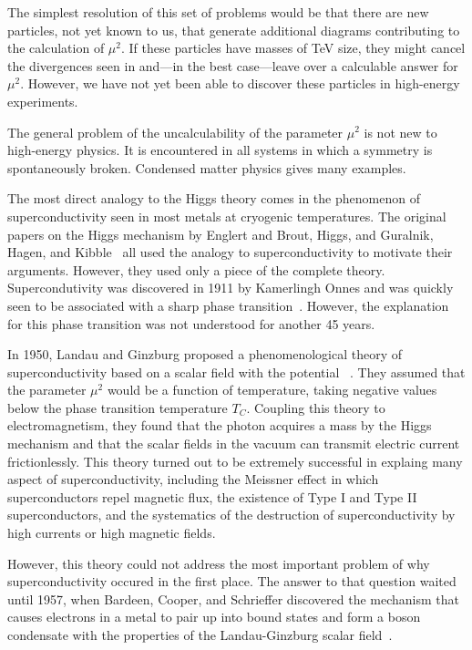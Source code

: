 \documentclass[12pt]{article}
\begin{document}
The simplest resolution of this set of problems would be that there
are new particles, not yet known to us, that generate additional
diagrams contributing to the calculation of $\mu^2$.   If these
particles have masses of TeV size, they might cancel the
divergences seen in  and---in the best case---leave
over a calculable answer for $\mu^2$.   However, we have not yet been
able to discover these particles in high-energy experiments.

The general problem of the uncalculability of the parameter $\mu^2$ is
not new to high-energy physics.   It is encountered in all systems in
which a symmetry is spontaneously broken.   Condensed matter physics
gives many examples.

The most direct analogy to the Higgs theory comes in the phenomenon of
superconductivity seen in most metals at cryogenic temperatures.   The
original papers on the Higgs mechanism by Englert and Brout, Higgs, 
and Guralnik, Hagen, and Kibble~\cite{BE,Higgs,GHK}  all used the analogy to
superconductivity to motivate their arguments.  However, they used
only a piece of the complete theory.   Supercondutivity was discovered
in 1911 by Kamerlingh Onnes and was quickly seen to be associated with
a sharp phase transition~\cite{Onnes}.  However, the explanation for this phase
transition was not understood for another 45 years.

In 1950, Landau and Ginzburg proposed a phenomenological theory of
superconductivity based on a scalar field with the potential
~\cite{Landau}.    They assumed that the parameter $\mu^2$
would be a function of temperature, taking negative values below the
phase transition temperature  $T_C$.   Coupling this theory to
electromagnetism, they found that the photon acquires a mass by the
Higgs mechanism and that the scalar fields in the vacuum can transmit
electric current frictionlessly. 
  This theory turned out to be extremely successful in
explaing many aspect of superconductivity, including the Meissner
effect in which superconductors repel magnetic flux, the existence of
Type I and Type II superconductors, and the systematics of the
destruction of superconductivity by high currents or high magnetic
fields.

However, this theory could not address the most important problem of
why superconductivity occured in the first place.  The answer to that
question waited until 1957, when Bardeen, Cooper, and Schrieffer
discovered the mechanism that causes electrons in a metal to pair up
into bound states and form a boson condensate with the properties of the Landau-Ginzburg
scalar field~\cite{BCS}.
\end{document}
